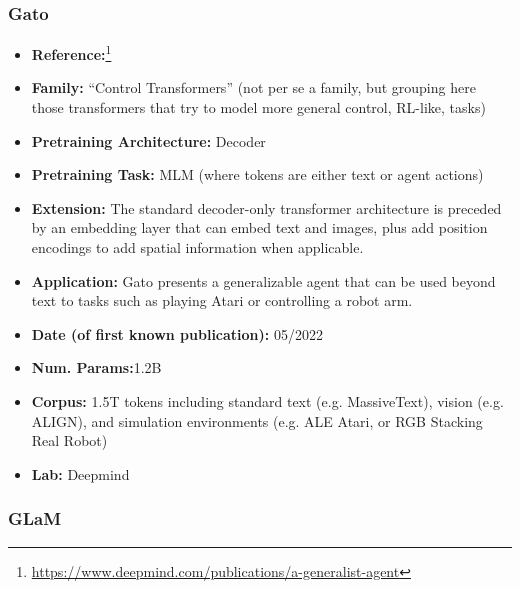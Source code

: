 \documentclass{article}
\begin{document}
\subsubsection{Gato}

            \begin{itemize}
                \item \textbf{Reference:}\footnote{\url{https://www.deepmind.com/publications/a-generalist-agent}}\cite{reed2022generalist}
                \item \textbf{Family:} “Control Transformers” (not per se a family, but grouping here those transformers that try to model more general control, RL-like, tasks) 
                \item \textbf{Pretraining Architecture:} Decoder
                \item \textbf{Pretraining Task:} MLM (where tokens are either text or agent actions)
                \item \textbf{Extension:} The standard decoder-only transformer architecture is preceded by an embedding layer that can embed text and images, plus add position encodings to add spatial information when applicable.  
                \item \textbf{Application:} Gato presents a generalizable agent that can be used beyond text to tasks such as playing Atari or controlling a robot arm.
                \item \textbf{Date (of first known publication):} 05/2022
                \item \textbf{Num. Params:}1.2B
                \item \textbf{Corpus:} 1.5T tokens including standard text (e.g. MassiveText), vision (e.g. ALIGN), and simulation environments (e.g. ALE Atari, or RGB Stacking Real Robot)
                \item \textbf{Lab:} Deepmind
            \end{itemize}

\subsubsection{GLaM}
\end{document}

